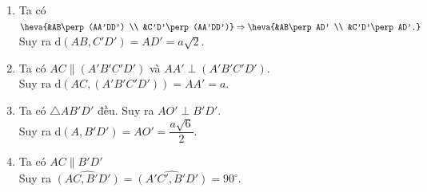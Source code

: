 \begin{ex}
{		\begin{enumerate}
			\item Ta có  $\heva{&AB\perp (AA'DD') \\ &C'D'\perp (AA'DD')}\Rightarrow
			\heva{&AB\perp AD'  \\ &C'D'\perp AD'.}$ \\
			Suy ra $\mathrm{d}(AB, C'D')=AD'=a\sqrt{2}$. 
			\item Ta có $AC\parallel \left(A'B'C'D'\right)$ và $AA'\perp \left(A'B'C'D'\right)$.  \\
			Suy ra $\mathrm{d}\left(AC, \left(A'B'C'D'\right)\right)=AA'=a$. 
			\item Ta có $\triangle AB'D'$ đều.  Suy ra $AO'\perp B'D'$. \\
			Suy ra $\mathrm{d}(A, B'D')=AO'=\dfrac{a\sqrt{6}}{2}$. 
			\item Ta có $AC\parallel  B'D'$ \\
			Suy  ra $\widehat{(AC, B'D')}=\widehat{(A'C', B'D')}=90^\circ$.
		\end{enumerate}
	} 
\end{ex}

